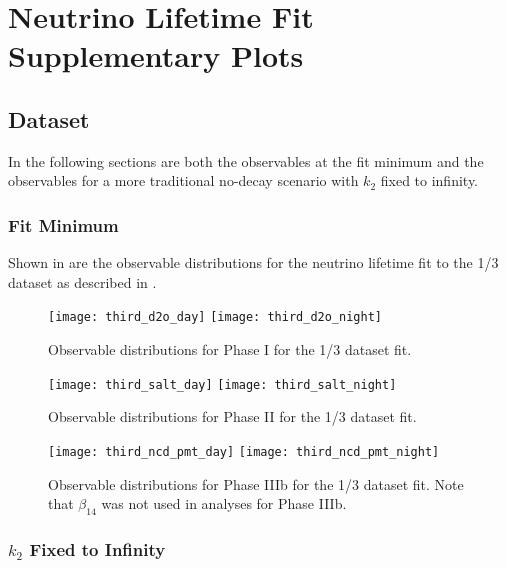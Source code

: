 \chapter{Neutrino Lifetime Fit Supplementary Plots}

\section{\texorpdfstring{}{1/3} Dataset}
\label{third_observables}

In the following sections are both the observables at the fit minimum and the observables for a more traditional no-decay scenario with $k_2$ fixed to infinity. 

\subsection{Fit Minimum}

Shown in  are the observable distributions for the neutrino lifetime fit to the 1/3 dataset as described in .

\begin{figure}
\centering
\texttt{[image: third\_d2o\_day]}
\texttt{[image: third\_d2o\_night]}
\caption{\label{fig:third_d2o_obs}Observable distributions for Phase I for the 1/3 dataset fit.}
\end{figure}
\begin{figure}
\centering
\texttt{[image: third\_salt\_day]}
\texttt{[image: third\_salt\_night]}
\caption{\label{fig:third_salt_obs}Observable distributions for Phase II for the 1/3 dataset fit.}
\end{figure}
\begin{figure}
\centering
\texttt{[image: third\_ncd\_pmt\_day]}
\texttt{[image: third\_ncd\_pmt\_night]}
\caption{\label{fig:third_ncd_pmt_obs}Observable distributions for Phase IIIb for the 1/3 dataset fit. Note that $\beta_{14}$ was not used in analyses for Phase IIIb.}
\end{figure}

\clearpage

\subsection{\texorpdfstring{$k_2$}{k2} Fixed to Infinity}

